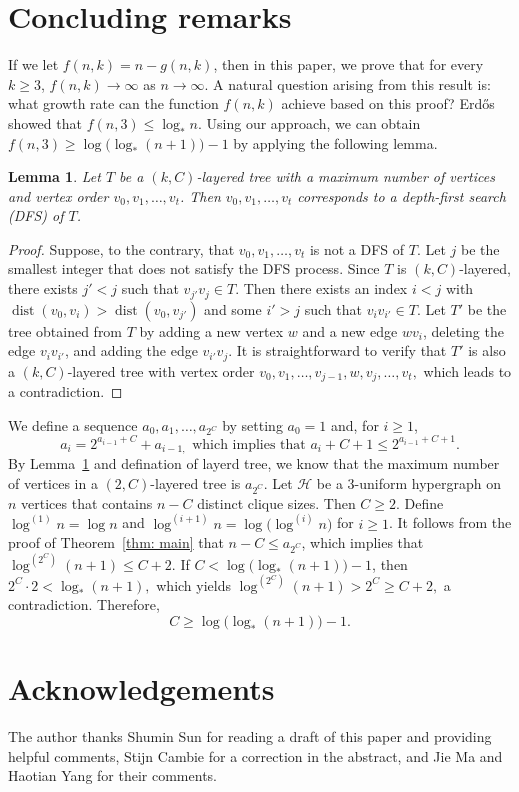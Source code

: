 \documentclass[11pt,a4paper]{article}
\newtheorem{lemma}[definition]{Lemma}
\newcommand{\dist}{\operatorname{dist}}
\begin{document}
\section{Concluding remarks} \label{sec:remark}
If we let $f(n,k) = n-g(n,k)$, then in this paper, we prove that for every $k \ge 3$, $f(n,k) \to \infty$ as $n \to \infty$. A natural question arising from this result is: what growth rate can the function $f(n,k)$ achieve based on this proof? Erd\H{o}s showed that $f(n,3) \le \log_* n$. Using our approach, we can obtain
$f(n,3) \ge \log\!\bigl(\log_*(n+1)\bigr) - 1$ by applying the following lemma.
\begin{lemma}\label{lem: max tree}
    Let $T$ be a $(k,C)$-layered tree with a maximum number of vertices and vertex order $v_0, v_1, \dots, v_t$. Then $v_0, v_1, \dots, v_t$ corresponds to a depth-first search (DFS) of $T$.
\end{lemma}
\begin{proof}
Suppose, to the contrary, that $v_0, v_1, \dots, v_t$ is not a DFS of $T$. 
Let $j$ be the smallest integer that does not satisfy the DFS process. 
Since $T$ is $(k, C)$-layered, there exists $j' < j$ such that $v_{j'}v_j \in T$. 
Then there exists an index $i<j$ with $\dist(v_0, v_i) > \dist(v_0, v_{j'})$ 
and some $i' > j$ such that $v_i v_{i'} \in T$. 
Let $T'$ be the tree obtained from $T$ by adding a new vertex $w$ 
and a new edge $w v_i$, deleting the edge $v_i v_{i'}$, 
and adding the edge $v_{i'} v_j$. 
It is straightforward to verify that $T'$ is also a $(k, C)$-layered tree 
with vertex order 
$v_0, v_1, \dots, v_{j-1}, w, v_j, \dots, v_t,$
which leads to a contradiction.
\end{proof}
We define a sequence $a_0, a_1, \dots, a_{2^C}$ by setting $a_0 = 1$ and, for $i \ge 1$, 
\[
a_i = 2^{a_{i-1} + C} + a_{i-1,}\text{ which implies that $a_i+C+1 \le 2^{a_{i-1}+C+1}.$}
\]
By Lemma~\ref{lem: max tree} and defination of layerd tree, we know that the maximum number of vertices in a $(2,C)$-layered tree is $a_{2^C}$.
Let $\mathcal{H}$ be a $3$-uniform hypergraph on $n$ vertices that contains $n - C$ distinct clique sizes. Then $C \ge 2$.
Define $\log^{(1)} n = \log n$ and $\log^{(i+1)} n = \log\bigl(\log^{(i)} n\bigr)$ for $i \ge 1$.
It follows from the proof of Theorem~\ref{thm: main} that $n - C \le a_{2^C}$, which implies that
$
\log^{(2^C)} (n+1) \le C + 2.
$
If $C < \log\!\bigl(\log_*(n+1)\bigr) - 1$, then
$2^{C} \cdot 2 < \log_*(n+1),$
which  yields
$\log^{(2^C)}(n+1) > 2^{C} \ge C + 2,$
a contradiction. Therefore,
\[
C \ge \log\!\bigl(\log_*(n+1)\bigr) - 1.
\]



\section*{Acknowledgements}
The author thanks Shumin Sun for reading a draft of this paper and providing helpful comments, Stijn Cambie for a correction in the abstract, and Jie Ma and Haotian Yang for their comments.


\end{document}
